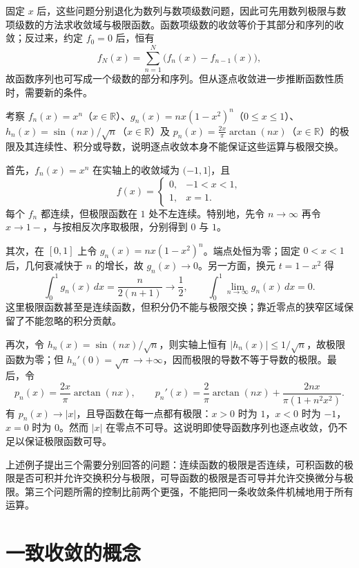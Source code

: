 固定 $x$ 后，这些问题分别退化为数列与数项级数问题，因此可先用数列极限与数项级数的方法求收敛域与极限函数。函数项级数的收敛等价于其部分和序列的收敛；反过来，约定 $f_0=0$ 后，恒有
\[
    f_N(x)=\sum_{n=1}^N\bigl(f_n(x)-f_{n-1}(x)\bigr),
\]
故函数序列也可写成一个级数的部分和序列。但从逐点收敛进一步推断函数性质时，需要新的条件。

\begin{example}
\label{ex:pointwise-limits-and-operation-failures}
考察 $f_n(x)=x^n$（$x\in\mathbb R$）、$g_n(x)=nx(1-x^2)^n$（$0\leq x\leq1$）、$h_n(x)=\sin(nx)/\sqrt n$（$x\in\mathbb R$）及 $p_n(x)=\frac{2x}{\pi}\arctan(nx)$（$x\in\mathbb R$）的极限及其连续性、积分或导数，说明逐点收敛本身不能保证这些运算与极限交换。
\end{example}

\begin{solve}
首先，$f_n(x)=x^n$ 在实轴上的收敛域为 $(-1,1]$，且
\[
    f(x)=\begin{cases}0,&-1<x<1,\\1,&x=1.\end{cases}
\]
每个 $f_n$ 都连续，但极限函数在 $1$ 处不左连续。特别地，先令 $n\to\infty$ 再令 $x\to1-$，与按相反次序取极限，分别得到 $0$ 与 $1$。

其次，在 $[0,1]$ 上令 $g_n(x)=nx(1-x^2)^n$。端点处恒为零；固定 $0<x<1$ 后，几何衰减快于 $n$ 的增长，故 $g_n(x)\to0$。另一方面，换元 $t=1-x^2$ 得
\[
    \int_0^1g_n(x)\,dx=\frac{n}{2(n+1)}\longrightarrow\frac12,
    \qquad \int_0^1\lim_{n\to\infty}g_n(x)\,dx=0.
\]
这里极限函数甚至是连续函数，但积分仍不能与极限交换；靠近零点的狭窄区域保留了不能忽略的积分贡献。

再次，令 $h_n(x)=\sin(nx)/\sqrt n$，则实轴上恒有 $|h_n(x)|\leq1/\sqrt n$，故极限函数为零；但 $h_n'(0)=\sqrt n\to+\infty$，因而极限的导数不等于导数的极限。最后，令
\[
    p_n(x)=\frac{2x}{\pi}\arctan(nx),\qquad
    p_n'(x)=\frac2\pi\arctan(nx)+\frac{2nx}{\pi(1+n^2x^2)}.
\]
有 $p_n(x)\to|x|$，且导函数在每一点都有极限：$x>0$ 时为 $1$，$x<0$ 时为 $-1$，$x=0$ 时为 $0$。然而 $|x|$ 在零点不可导。这说明即使导函数序列也逐点收敛，仍不足以保证极限函数可导。
\end{solve}

上述例子提出三个需要分别回答的问题：连续函数的极限是否连续，可积函数的极限是否可积并允许交换积分与极限，可导函数的极限是否可导并允许交换微分与极限。第三个问题所需的控制比前两个更强，不能把同一条收敛条件机械地用于所有运算。

\section{一致收敛的概念}
\label{sec:concept-of-uniform-convergence}

